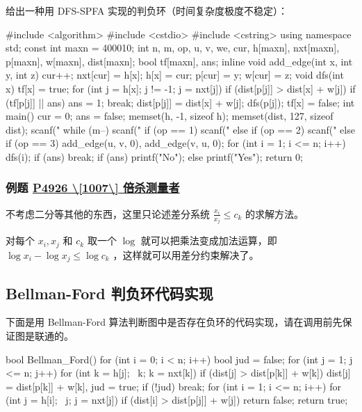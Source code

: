 给出一种用 DFS-SPFA 实现的判负环（时间复杂度极度不稳定）：

\begin{cppcode}
#include <algorithm>
#include <cstdio>
#include <cstring>
using namespace std;
const int maxn = 400010;
int n, m, op, u, v, we, cur, h[maxn], nxt[maxn], p[maxn], w[maxn], dist[maxn];
bool tf[maxn], ans;
inline void add_edge(int x, int y, int z) {
  cur++;
  nxt[cur] = h[x];
  h[x] = cur;
  p[cur] = y;
  w[cur] = z;
}
void dfs(int x) {
  tf[x] = true;
  for (int j = h[x]; j != -1; j = nxt[j])
    if (dist[p[j]] > dist[x] + w[j]) {
      if (tf[p[j]] || ans) {
        ans = 1;
        break;
      }
      dist[p[j]] = dist[x] + w[j];
      dfs(p[j]);
    }
  tf[x] = false;
}
int main() {
  cur = 0;
  ans = false;
  memset(h, -1, sizeof h);
  memset(dist, 127, sizeof dist);
  scanf("%
  while (m--) {
    scanf("%
    if (op == 1)
      scanf("%
    else if (op == 2)
      scanf("%
    else if (op == 3)
      add_edge(u, v, 0), add_edge(v, u, 0);
  }
  for (int i = 1; i <= n; i++) {
    dfs(i);
    if (ans) break;
  }
  if (ans)
    printf("No\n");
  else
    printf("Yes\n");
  return 0;
}
\end{cppcode}

\subsubsection{例题 \href{https://www.luogu.org/problemnew/show/P4926}{P4926 \textbackslash{}[1007\textbackslash{}] 倍杀测量者}}

不考虑二分等其他的东西，这里只论述差分系统 $\frac{x_i}{x_j}\leq c_k$  的求解方法。

对每个 $x_i,x_j$ 和 $c_k$ 取一个 $\log$ 就可以把乘法变成加法运算，即 $\log x_i-\log x_j \leq \log c_k$  ，这样就可以用差分约束解决了。

\subsection{Bellman-Ford 判负环代码实现}

下面是用 Bellman-Ford 算法判断图中是否存在负环的代码实现，请在调用前先保证图是联通的。

\begin{cppcode}
bool Bellman_Ford() {
  for (int i = 0; i < n; i++) {
    bool jud = false;
    for (int j = 1; j <= n; j++)
      for (int k = h[j]; ~k; k = nxt[k])
        if (dist[j] > dist[p[k]] + w[k])
          dist[j] = dist[p[k]] + w[k], jud = true;
    if (!jud) break;
  }
  for (int i = 1; i <= n; i++)
    for (int j = h[i]; ~j; j = nxt[j])
      if (dist[i] > dist[p[j]] + w[j]) return false;
  return true;
}
\end{cppcode}

